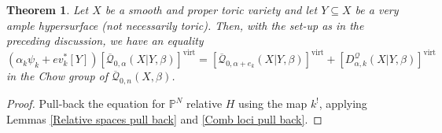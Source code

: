 \documentclass[11pt]{amsart}
\newcommand{\Q}[4]{\overline{\mathcal Q}_{#1,#2}(#3,#4)}
\newcommand{\PP}{\mathbb P}
\newcommand{\virt}[1]{[#1]^{\operatorname{virt}}}
\theoremstyle{plain}
\newtheorem{thm}{Theorem}[section]
\theoremstyle{definition}
\begin{document}
\begin{thm} Let $X$ be a smooth and proper toric variety and let $Y \subseteq X$ be a very ample hypersurface (not necessarily toric). Then, with the set-up as in the preceding discussion, we have an equality
\begin{equation*} (\alpha_k \psi_k + ev_k^* [Y]) \virt{\Q{0}{\alpha}{X|Y}{\beta}} = \virt{\Q{0}{\alpha+e_k}{X|Y}{\beta}} + \virt{D^\mathcal{Q}_{\alpha,k}(X|Y,\beta)} \end{equation*}
in the Chow group of $\Q{0}{n}{X}{\beta}$. \end{thm}
\begin{proof} Pull-back the equation for $\PP^N$ relative $H$ using the map $k^!$, applying Lemmas \ref{Relative spaces pull back} and \ref{Comb loci pull back}. \end{proof}








\newpage
\end{document}
